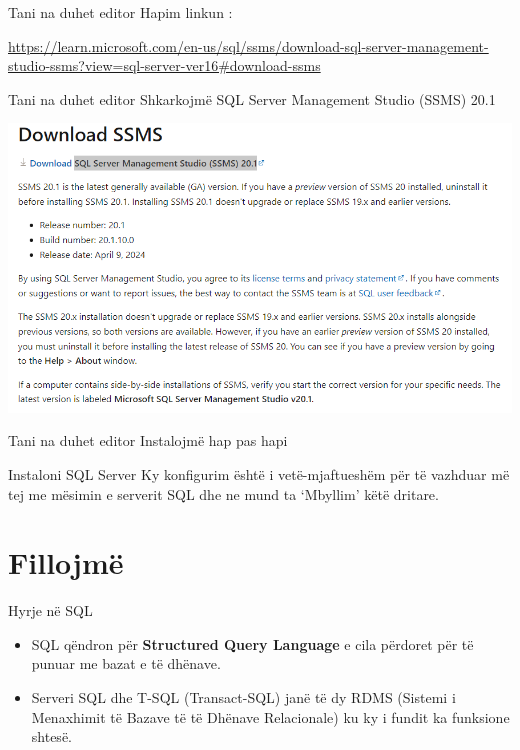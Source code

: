 \documentclass[
  ignorenonframetext,
]{beamer}
\begin{document}
\begin{frame}{Tani na duhet editor}
\label{tani-na-duhet-editor}
Hapim linkun :

\url{https://learn.microsoft.com/en-us/sql/ssms/download-sql-server-management-studio-ssms?view=sql-server-ver16\#download-ssms}
\end{frame}

\begin{frame}{Tani na duhet editor}
\label{tani-na-duhet-editor-1}
Shkarkojmë SQL Server Management Studio (SSMS) 20.1

\includegraphics{./Figs/install8.png}
\end{frame}

\begin{frame}{Tani na duhet editor}
\label{tani-na-duhet-editor-2}
Instalojmë hap pas hapi
\end{frame}

\begin{frame}{Instaloni SQL Server}
\label{instaloni-sql-server-10}
Ky konfigurim është i vetë-mjaftueshëm për të vazhduar më tej me mësimin
e serverit SQL dhe ne mund ta `Mbyllim' këtë dritare.
\end{frame}

\section{Fillojmë}\label{fillojmuxeb}

\begin{frame}{Hyrje në SQL}
\label{hyrje-nuxeb-sql-1}
\begin{itemize}
\item
  SQL qëndron për \textbf{Structured Query Language} e cila përdoret për
  të punuar me bazat e të dhënave.
\item
  Serveri SQL dhe T-SQL (Transact-SQL) janë të dy RDMS (Sistemi i
  Menaxhimit të Bazave të të Dhënave Relacionale) ku ky i fundit ka
  funksione shtesë.
\end{itemize}
\end{frame}
\end{document}
